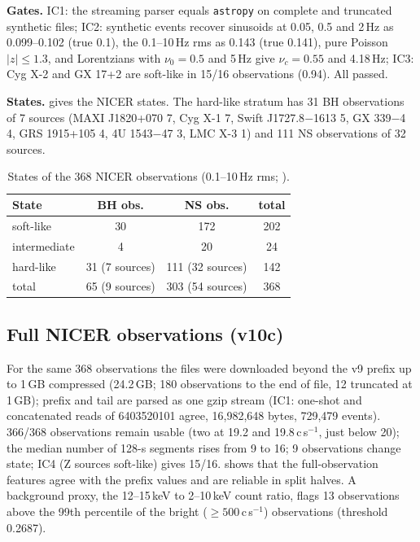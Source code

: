 \textbf{Gates.} IC1: the streaming parser equals \texttt{astropy} on complete and truncated synthetic files; IC2: synthetic events
recover sinusoids at 0.05, 0.5 and 2\,Hz as 0.099--0.102 (true 0.1), the 0.1--10\,Hz rms as 0.143 (true 0.141), pure Poisson
$|z|\le1.3$, and Lorentzians with $\nu_0=0.5$ and 5\,Hz give $\nu_c=0.55$ and 4.18\,Hz; IC3: Cyg X-2 and GX 17+2 are soft-like in
15/16 observations (0.94). All passed.

\textbf{States.}  gives the NICER states. The hard-like stratum has 31 BH observations of 7 sources (MAXI
J1820+070 7, Cyg X-1 7, Swift J1727.8$-$1613 5, GX 339$-$4 4, GRS 1915+105 4, 4U 1543$-$47 3, LMC X-3 1) and 111 NS observations of
32 sources.

\begin{table}[htbp]
\centering\small
\caption[NICER states]{States of the 368 NICER observations (0.1--10\,Hz rms; ).}
\label{tab:p5states}
\begin{tabular}{@{}lccc@{}}
\toprule
State & BH obs. & NS obs. & total \\
\midrule
soft-like & 30 & 172 & 202 \\
intermediate & 4 & 20 & 24 \\
hard-like & 31 (7 sources) & 111 (32 sources) & 142 \\
\midrule
total & 65 (9 sources) & 303 (54 sources) & 368 \\
\bottomrule
\end{tabular}
\end{table}

\subsection{Full NICER observations (v10c)}
For the same 368 observations the files were downloaded beyond the v9 prefix up to 1\,GB compressed (24.2\,GB; 180 observations to
the end of file, 12 truncated at 1\,GB); prefix and tail are parsed as one gzip stream (IC1: one-shot and concatenated reads of
6403520101 agree, 16,982,648 bytes, 729,479 events). 366/368 observations remain usable (two at 19.2 and 19.8\,c\,s$^{-1}$, just below
20); the median number of 128-s segments rises from 9 to 16; 9 observations change state; IC4 (Z sources soft-like) gives 15/16.
 shows that the full-observation features agree with the prefix values and are reliable in split halves. A
background proxy, the 12--15\,keV to 2--10\,keV count ratio, flags 13 observations above the 99th percentile of the bright
($\ge500$\,c\,s$^{-1}$) observations (threshold 0.2687).

